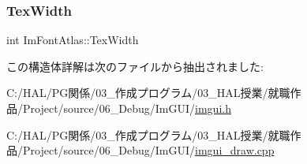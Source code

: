 \subsubsection{\texorpdfstring{Tex\+Width}{TexWidth}}
{\footnotesize\ttfamily int Im\+Font\+Atlas\+::\+Tex\+Width}



この構造体詳解は次のファイルから抽出されました\+:\begin{DoxyCompactItemize}
\item 
C\+:/\+H\+A\+L/\+P\+G関係/03\+\_\+作成プログラム/03\+\_\+\+H\+A\+L授業/就職作品/\+Project/source/06\+\_\+\+Debug/\+Im\+G\+U\+I/\mbox{\hyperlink{imgui_8h}{imgui.\+h}}\item 
C\+:/\+H\+A\+L/\+P\+G関係/03\+\_\+作成プログラム/03\+\_\+\+H\+A\+L授業/就職作品/\+Project/source/06\+\_\+\+Debug/\+Im\+G\+U\+I/\mbox{\hyperlink{imgui__draw_8cpp}{imgui\+\_\+draw.\+cpp}}\end{DoxyCompactItemize}
